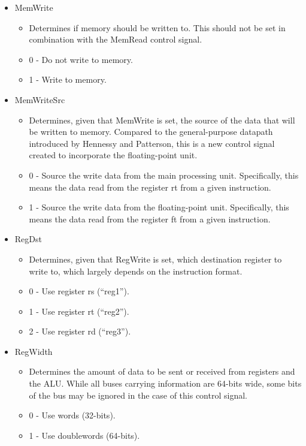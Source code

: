 \documentclass[
    paper=letter,
    parskip=half,
    fontsize=12pt,
    titlepage=firstiscover,
    toc=bibliography,
    numbers=endperiod
]{scrartcl}
\providecommand{\tightlist}{%
  \setlength{\itemsep}{0pt}\setlength{\parskip}{0pt}}
\begin{document}
\begin{itemize}
    \item MemWrite
          \begin{itemize}
              \tightlist
              \item Determines if memory should be written to. This should not be set in
                    combination with the MemRead control signal.
              \item 0 - Do not write to memory.
              \item 1 - Write to memory.
          \end{itemize}

    \item MemWriteSrc
          \begin{itemize}
              \tightlist
              \item Determines, given that MemWrite is set, the source of the data that will
                    be written to memory. Compared to the general-purpose datapath
                    introduced by Hennessy and Patterson, this is a new control signal
                    created to incorporate the floating-point unit.
              \item 0 - Source the write data from the main processing unit.
                    Specifically, this means the data read from the register rt from a
                    given instruction.
              \item 1 - Source the write data from the floating-point unit.
                    Specifically, this means the data read from the register ft from a
                    given instruction.
          \end{itemize}

    \item RegDst
          \begin{itemize}
              \tightlist
              \item Determines, given that RegWrite is set, which destination register to
                    write to, which largely depends on the instruction format.
              \item 0 - Use register rs (``reg1'').
              \item 1 - Use register rt (``reg2'').
              \item 2 - Use register rd (``reg3'').
          \end{itemize}

    \item RegWidth
          \begin{itemize}
              \tightlist
              \item Determines the amount of data to be sent or received from registers and
                    the ALU. While all buses carrying information are 64-bits wide, some
                    bits of the bus may be ignored in the case of this control signal.
              \item 0 - Use words (32-bits).
              \item 1 - Use doublewords (64-bits).
          \end{itemize}


\end{itemize}
\end{document}
